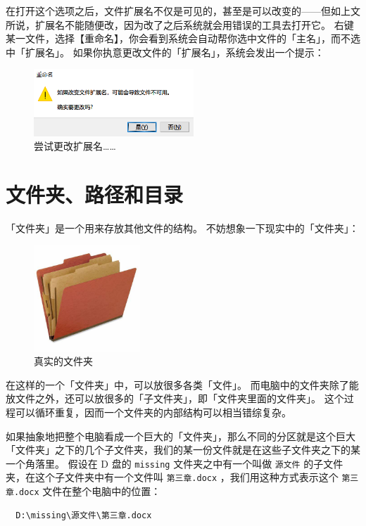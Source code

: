 在打开这个选项之后，文件扩展名不仅是可见的，甚至是可以改变的——但如上文所说，扩展名不能随便改，因为改了之后系统就会用错误的工具去打开它。
右键某一文件，选择【重命名】，你会看到系统会自动帮你选中文件的「主名」，而不选中「扩展名」。
如果你执意更改文件的「扩展名」，系统会发出一个提示：

\begin{figure}[htb!]
  \centering
  \includegraphics[width=6cm]{assets/Warning_of_Changing_Ext.png}
  \caption{尝试更改扩展名……}
  \label{Warning_of_Changing_Ext}
\end{figure}

\section{文件夹、路径和目录}

「文件夹」是一个用来存放其他文件的结构。
不妨想象一下现实中的「文件夹」：

\begin{figure}[htb!]
  \centering
  \includegraphics[width=4cm]{assets/Real_Folder.png}
  \caption{真实的文件夹}
  \label{Real_Folder}
\end{figure}

在这样的一个「文件夹」中，可以放很多各类「文件」。
而电脑中的文件夹除了能放文件之外，还可以放很多的「子文件夹」，即「文件夹里面的文件夹」。
这个过程可以循环重复，因而一个文件夹的内部结构可以相当错综复杂。

如果抽象地把整个电脑看成一个巨大的「文件夹」，那么不同的分区就是这个巨大「文件夹」之下的几个子文件夹，我们的某一份文件就是在这些子文件夹之下的某一个角落里。
假设在 D 盘的 \verb|missing| 文件夹之中有一个叫做 \verb|源文件| 的子文件夹，在这个子文件夹中有一个文件叫 \verb|第三章.docx| ，我们用这种方式表示这个 \verb|第三章.docx| 文件在整个电脑中的位置：

\begin{verbatim}
  D:\missing\源文件\第三章.docx
\end{verbatim}

